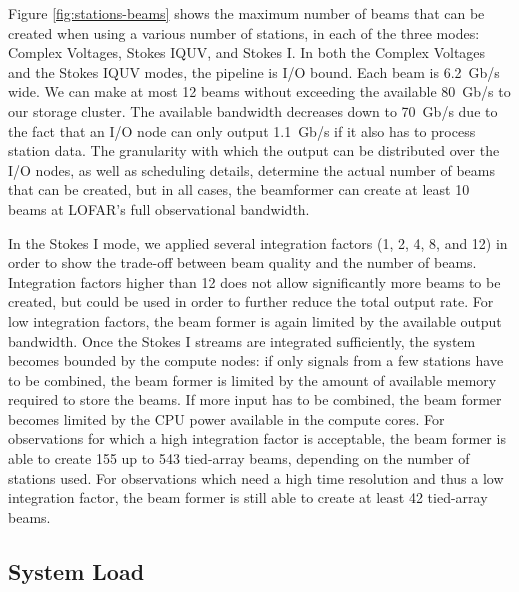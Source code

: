 \documentclass{llncs}
\begin{document}
Figure \ref{fig:stations-beams} shows the maximum number of beams that can be created when using a various number of stations, in each of the three modes: Complex Voltages, Stokes IQUV, and Stokes I. In both the Complex Voltages and the Stokes IQUV modes, the pipeline is I/O bound. Each beam is 6.2~Gb/s wide. We can make at most 12 beams without exceeding the available 80~Gb/s to our storage cluster. The available bandwidth decreases down to 70~Gb/s due to the fact that an I/O node can only output 1.1~Gb/s if it also has to process station data. The granularity with which the output can be distributed over the I/O nodes, as well as scheduling details, determine the actual number of beams that can be created, but in all cases, the beamformer can create at least 10 beams at LOFAR's full observational bandwidth.

In the Stokes I mode, we applied several integration factors (1, 2, 4, 8, and 12) in order to show the trade-off between beam quality and the number of beams. Integration factors higher than 12 does not allow significantly more beams to be created, but could be used in order to further reduce the total output rate. For low integration factors, the beam former is again limited by the available output bandwidth. Once the Stokes I streams are integrated sufficiently, the system becomes bounded by the compute nodes: if only signals from a few stations have to be combined, the beam former is limited by the amount of available memory required to store the beams. If more input has to be combined, the beam former becomes limited by the CPU power available in the compute cores. For observations for which a high integration factor is acceptable, the beam former is able to create 155 up to 543 tied-array beams, depending on the number of stations used. For observations which need a high time resolution and thus a low integration factor, the beam former is still able to create at least 42 tied-array beams.

\subsection{System Load}
\end{document}
